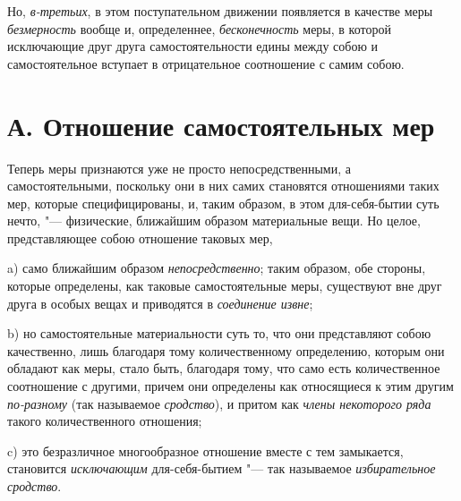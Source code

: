 Но, {\em в-третьих}, в этом поступательном движении
появляется в качестве меры {\em безмерность} вообще и,
определеннее, {\em бесконечность} меры, в которой
исключающие друг друга самостоятельности едины между собою и
самостоятельное вступает в отрицательное соотношение с самим собою.


\section[А. Отношение самостоятельных мер]{А. Отношение самостоятельных мер}

Теперь меры признаются уже не просто
непосредственными, а самостоятельными, поскольку они в них самих становятся
отношениями таких мер, которые специфицированы, и, таким образом, в этом
для-себя-бытии суть нечто, "--- физические, ближайшим образом материальные
вещи. Но целое, представляющее собою отношение таковых мер,

a) само ближайшим образом {\em непосредственно}; таким
образом, обе стороны, которые определены, как таковые самостоятельные меры,
существуют вне друг друга в особых вещах и приводятся в
{\em соединение извне};

b) но самостоятельные материальности суть то, что они представляют собою
качественно, лишь благодаря тому количественному определению, которым они
обладают как меры, стало быть, благодаря тому, что само есть количественное
соотношение с другими, причем они определены как относящиеся к этим другим
{\em по-разному} (так называемое {\em сродство}), и притом как
{\em члены некоторого ряда} такого количественного отношения;

c) это безразличное многообразное отношение вместе с тем замыкается,
становится {\em исключающим} для-себя-бытием "--- так
называемое {\em избирательное сродство}.

